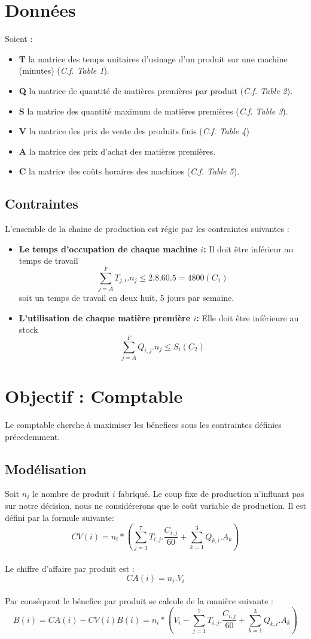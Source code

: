 
\section{Données}
Soient :
\begin{itemize}
  \item \textbf{T} la matrice des temps unitaires d'usinage d'un produit sur une
  machine (minutes) (\textsl{C.f. Table 1}).
  \item \textbf{Q} la matrice de quantité de matières premières par produit
  (\textsl{C.f. Table 2}).
  \item \textbf{S} la matrice des quantité maximum de matières premières
  (\textsl{C.f. Table 3}).
  \item \textbf{V} la matrice des prix de vente des produits finis (\textsl{C.f.
  Table 4})
  \item \textbf{A} la matrice des prix d'achat des matières premières.
  \item \textbf{C} la matrice des coûts horaires des machines (\textsl{C.f.
  Table 5}).
\end{itemize}

\subsection{Contraintes}
L'ensemble de la chaine de production est régie par les contraintes suivantes :
\begin{itemize}
  \item \textbf{Le temps d'occupation de chaque machine $i$:} Il doit être
  inférieur au temps de travail
  $$
  	\sum_{j = A}^{F} T_{j,i} . n_j \leq 2.8.60.5 = 4800 (C_1)
  $$ soit un temps de travail en deux huit, 5 jours par semaine.
  \item \textbf{L'utilisation de chaque matière première  $i$:} Elle doit être
  inférieure au stock
  $$
  	\sum_{j = A}^{F} Q_{i,j} . n_j \leq S_i (C_2)
  $$
\end{itemize}

\section{Objectif : Comptable}
Le comptable cherche à maximiser les bénefices sous les contraintes définies
précedemment.

\subsection{Modélisation}
Soit $n_i$ le nombre de produit $i$ fabriqué. Le coup fixe de production
n'influant pas sur notre décision, nous ne considérerons que le coût variable de
production. Il est défini par la formule suivante: $$
CV(i) = n_i * \left (\sum_{j = 1}^{7} T_{i,j} .
\frac{C_{i,j}}{60} + \sum_{k = 1}^{3} Q_{k,i} . A_{k} \right )
$$
~\\
Le chiffre d'affaire par produit est :
$$
CA(i) = n_i . V_i
$$
~\\
Par conséquent le bénefice par produit se calcule de la manière suivante :
$$
B(i) = CA(i) - CV(i)
B(i) = n_i * \left (V_i - \sum_{j = 1}^{7} T_{i,j} .
\frac{C_{i,j}}{60} + \sum_{k = 1}^{3} Q_{k,i} . A_{k} \right )
$$